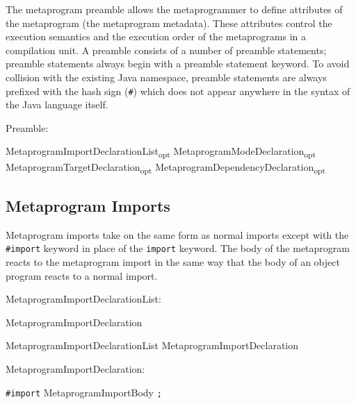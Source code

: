 \documentclass[a4paper,10pt]{report}
\newcommand{\opt}{\textsubscript{opt}}
\newenvironment{grammar}{
    \begin{list}{}{
        \itshape
        \setlength{\partopsep}{\topsep}
        \setlength{\topsep}{0cm}
    }
}{
    \end{list}
}
\begin{document}
The metaprogram preamble allows the metaprogrammer to define attributes of the metaprogram (the metaprogram metadata).  These attributes control the execution semantics and the execution order of the metaprograms in a compilation unit.  A preamble consists of a number of preamble statements; preamble statements always begin with a preamble statement keyword.  To avoid collision with the existing Java namespace, preamble statements are always prefixed with the hash sign (\verb`#`) which does not appear anywhere in the syntax of the Java language itself.

\begin{grammar}
    \item Preamble:
    \begin{grammar}
        \item
            MetaprogramImportDeclarationList\opt{}
            MetaprogramModeDeclaration\opt{}
            MetaprogramTargetDeclaration\opt{}
            MetaprogramDependencyDeclaration\opt{}
    \end{grammar}
\end{grammar}

\subsection{Metaprogram Imports}
\label{secMetaprogPreambleImports}

Metaprogram imports take on the same form as normal imports except with the \verb`#import` keyword in place of the \verb`import` keyword.  The body of the metaprogram reacts to the metaprogram import in the same way that the body of an object program reacts to a normal import.

\begin{grammar}
    \item MetaprogramImportDeclarationList:
    \begin{grammar}
        \item MetaprogramImportDeclaration
        \item MetaprogramImportDeclarationList MetaprogramImportDeclaration
    \end{grammar}
\end{grammar}

\begin{grammar}
    \item MetaprogramImportDeclaration:
    \begin{grammar}
        \item \verb`#import` MetaprogramImportBody \verb`;`
    \end{grammar}
\end{grammar}
\end{document}
